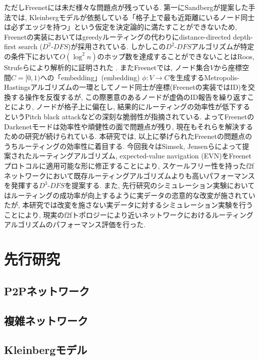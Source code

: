 \documentclass[dvipdfmx]{ampbt}
\begin{document}
ただしFreenetには未だ様々な問題点が残っている. 第一にSandbergが提案した手法では, Kleinbergモデルが依拠している「格子上で最も近距離にいるノード同士は必ずエッジを持つ」という仮定を決定論的に満たすことができないため, Freenetの実装においてはgreedyルーティングの代わりにdistance-directed depth-first search ($D^2$-$DFS$)が採用されている. しかしこの$D^2$-$DFS$アルゴリズムが特定の条件下において$O(\log^2 n)$のホップ数を達成することができないことはRoos, Strufeらにより解析的に証明された\cite{roos2012provable} \cite{roos2016dealing}\cite{roos2016analyzing}. またFreenetでは, ノード集合$V$から座標空間$C= [0,1)$への「\gls{embedding}」(embedding) $\phi: V \to C$を生成するMetropolis-Hastingsアルゴリズムの一環としてノード同士が座標(Freenetの実装ではID)を交換する操作を反復するが, この際悪意のあるノードが虚偽のID報告を繰り返すことにより, ノードが格子上に偏在し, 結果的にルーティングの効率性が低下するというPitch black attack\cite{evans2007routing}などの深刻な脆弱性が指摘されている. よってFreenetのDarkenetモードは効率性や頑健性の面で問題点が残り, 現在もそれらを解決するための研究が続けられている. \newline
本研究では, 以上に挙げられたFreenetの問題点のうちルーティングの効率性に着目する. 今回我々はSimsek, Jensenらによって提案されたルーティングアルゴリズム, expected-value navigation (EVN)\cite{csimcsek2008navigating}をFreenetプロトコルに適用可能な形に修正することにより, スケールフリー性を持った\acrshort{f2f}ネットワークにおいて既存ルーティングアルゴリズムよりも高いパフォーマンスを発揮する$D^3$-$DFS$を提案する. また, 先行研究のシミュレーション実験においてはルーティングの成功率が向上するように実データの恣意的な改変が施されていたが, 本研究では改変を施さない実データに対するシミュレーション実験を行うことにより, 現実の\acrshort{f2f}トポロジーにより近いネットワークにおけるルーティングアルゴリズムのパフォーマンス評価を行った.

 \section{先行研究}
   \subsection{P2Pネットワーク}
   \subsection{複雑ネットワーク}
   \subsection{Kleinbergモデル} \label{sec:kleinberg}
\end{document}
